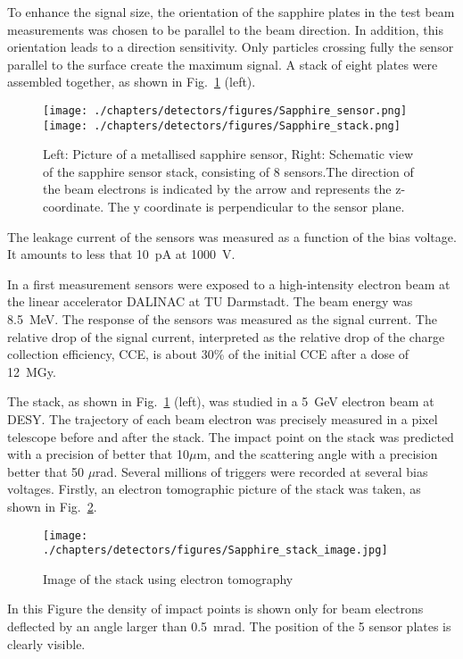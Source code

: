 To enhance the signal size, the orientation of the sapphire plates
in the test beam measurements was chosen to be parallel to the beam direction. In addition, this orientation leads to a direction sensitivity. Only particles crossing fully the sensor parallel to the surface create the maximum signal. A stack of eight plates were assembled together, as shown in Fig.~\ref{sapphire_stack} (left).
\begin{figure}[ht!]
\begin{center}
    \texttt{[image: ./chapters/detectors/figures/Sapphire\_sensor.png]}
    \texttt{[image: ./chapters/detectors/figures/Sapphire\_stack.png]}
    \caption{Left: Picture of a metallised sapphire sensor, Right: Schematic view of the sapphire sensor stack, consisting of 8 sensors.The direction of the beam electrons is indicated by the arrow and represents the z-coordinate. The y coordinate is perpendicular to the sensor plane.}
    \label{sapphire_stack}
  \hspace{0.025\textwidth}
  \end{center}
\end{figure}
The leakage current of the sensors was measured as a function of the bias voltage. It amounts to less that 10~pA at 1000~V. 

In a first measurement sensors were exposed to a high-intensity electron
beam at the linear accelerator DALINAC at TU Darmstadt. The beam energy was
8.5~MeV. The response of the sensors was measured
as the signal current. The relative drop of the signal current, interpreted as the relative drop
of the charge collection efficiency, CCE, is about 30\% of the initial CCE after a dose of 12~MGy.

The stack, as shown in Fig.~\ref{sapphire_stack} (left), was studied in a 5~GeV electron beam at DESY. The trajectory of each beam electron was precisely measured in a pixel telescope before and after the stack. The impact point on the stack was predicted with a precision of better that 10$\mu$m, and the scattering angle with a precision better that 50 $\mu$rad.
Several millions of triggers were recorded at several bias voltages.
Firstly, an electron tomographic picture of the stack was taken, as shown in Fig.~\ref{sapphire_stack_image}.
\begin{figure}[t]
\begin{center}
    \texttt{[image: ./chapters/detectors/figures/Sapphire\_stack\_image.jpg]}
    \caption{Image of the stack using electron tomography}
    \label{sapphire_stack_image}
  \hspace{0.025\textwidth}
  \end{center}
\end{figure}
In this Figure the density of impact points is shown only for beam electrons deflected by an angle larger than 0.5~mrad. The position of the 5 sensor plates is clearly visible.  

